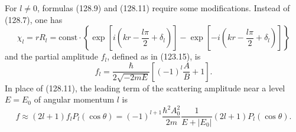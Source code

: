 For $l\ne0$, formulas (128.9) and (128.11) require some modifications. Instead
of (128.7), one has
\begin{equation}
 \chi_l=rR_l=\mathrm{const}\cdot\left\{
 \exp\left[i\left(kr-\frac{l\pi}2+\delta_l\right)\right]
 -\exp\left[-i\left(kr-\frac{l\pi}2+\delta_l\right)\right]\right\}
 \tag{128.15}
\end{equation}
and the partial amplitude $f_l$, defined as in (123.15), is
\begin{equation}
 f_l=\frac{\hbar}{2\sqrt{-2mE}}
 \left[(-1)^l\frac AB+1\right].
 \tag{128.16}
\end{equation}
In place of (128.11), the leading term of the scattering amplitude near a
level $E=E_0$ of angular momentum $l$ is
\begin{equation}
 f\approx(2l+1)f_lP_l(\cos\theta)
 =(-1)^{l+1}\frac{\hbar^2A_0^2}{2m}
 \frac1{E+|E_0|}(2l+1)P_l(\cos\theta).
 \tag{128.17}
\end{equation}
